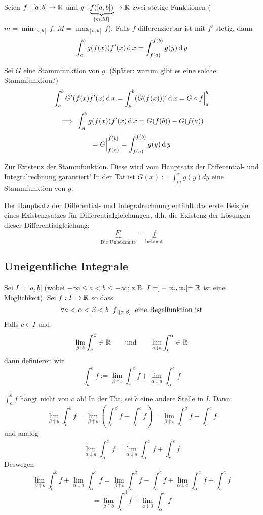 \begin{Sat}[Substitutionsregel]
  Seien $f:[a,b]\to\mathbb{R}$ und $g:\underbrace{f([a,b])}_{[m,M]}\to\mathbb{R}$ zwei stetige Funktionen ($m=\min_{[a,b]}f$, $M=\max_{[a,b]}f$). Falls $f$ differenzierbar ist mit $f'$ stetig, dann
  \[\int_a^bg(f(x))f'(x)\operatorname{d} x=\int_{f(a)}^{f(b)}g(y)\operatorname{d} y\]
\end{Sat}
\begin{Bew}
  Sei $G$ eine Stammfunktion von $g$. (Später: warum gibt es eine solche Stammfunktion?)
  \[\int_a^bG'(f(x)f'(x)\operatorname{d} x=\int_a^b(G(f(x)))'\operatorname{d} x=G\circ f\Big|_a^b\]
  \[\implies \int_A^bg(f(x))f'(x)\operatorname{d} x=G(f(b))-G(f(a))\]
  \[=G\Big|_{f(a)}^{f(b)}=\int_{f(a)}^{f(b)}g(y)\operatorname{d} y\]

  Zur Existenz der Stammfunktion. Diese wird vom Hauptsatz der Differential- und Integralrechnung
garantiert! In der Tat ist $G(x):= \int_m^x g(y) dy$ eine Stammfunktion von $g$.
\end{Bew}
\begin{Bem} Der Hauptsatz der Differential- und Integralrechnung ent\"ahlt das erste
Beispiel eines Existenzsatzes f\"ur Differentialgleichungen, d.h.
die Existenz der Lösungen dieser Differentialgleichung:
  \[\underbrace{F'}_{\text{Die Unbekannte}}=\underbrace{f}_{\text{bekannt}}\]
\end{Bem}
\subsection{Uneigentliche Integrale}
\begin{Def}
  Sei $I=]a,b[$ (wobei $-\infty\leq a<b\leq +\infty$; z.B. $I=]-\infty,\infty[=\mathbb{R}$ ist eine
M\"oglichkeit). Sei $f:I\to\mathbb{R}$ so dass
  \[\forall a<\alpha<\beta<b\hspace{2mm} f|_{[\alpha,\beta]}\hspace{2mm}\text{eine Regelfunktion ist}\]
  Falls $c\in I$ und
  \[\lim_{\beta\uparrow b}\int_c^\beta\in\mathbb{R}\qquad \mbox{und}\qquad
\lim_{\alpha\downarrow a}\int_c^\alpha\in\mathbb{R}\]
  dann definieren wir
  \[\int_a^bf:=\lim_{\beta\uparrow b}\int_c^\beta f+\lim_{\alpha\downarrow a}\int_\alpha^cf\]
\end{Def}
\begin{Bem} $\int_a^b f$ h\"angt nicht von $c$ ab! In der Tat, sei $\tilde{c}$ eine andere
 Stelle in $I$. Dann:
\[\lim_{\beta\uparrow b}\int_{\tilde c}^bf
=\lim_{\beta\uparrow b}\left( \int_c^\beta f-\int_c^{\tilde c}f \right)
=\lim_{\beta\uparrow b}\int_c^\beta f-\int_c^{\tilde c}f\]
und analog  
\[\lim_{\alpha\downarrow a}\int_\alpha^{\tilde c}f=
\lim_{\alpha\downarrow a}\int_\alpha^c f+\int_c^{\tilde c}f\]
Deswegen
\[
\lim_{\beta\uparrow b}\int_{\tilde c}^bf +  \lim_{\alpha\downarrow a}\int_\alpha^{\tilde c}f
 =\lim_{\beta\uparrow b}\int_c^\beta f-\int_c^{\tilde c}f + \lim_{\alpha\downarrow a}\int_\alpha^c f+\int_c^{\tilde c}f
\]
\[
 =\lim_{\beta\uparrow b}\int_c^\beta f+\lim_{a\downarrow 0}\int_\alpha^cf
\]


\end{Bem}
